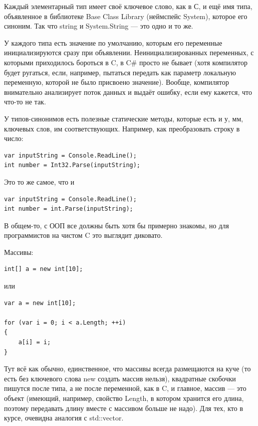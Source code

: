 \documentclass{../../text-style}
\begin{document}
Каждый элементарный тип имеет своё ключевое слово, как в С, и ещё имя типа, объявленное в библиотеке Base Class Library (неймспейс System), которое его синоним. Так что string и System.String --- это одно и то же.

У каждого типа есть значение по умолчанию, которым его переменные инициализируются сразу при объявлении. Неинициализированных переменных, с которыми приходилось бороться в C, в C\# просто не бывает (хотя компилятор будет ругаться, если, например, пытаться передать как параметр локальную переменную, которой не было присвоено значение). Вообще, компилятор внимательно анализирует поток данных и выдаёт ошибку, если ему кажется, что что-то не так.

У типов-синонимов есть полезные статические методы, которые есть и у, мм, ключевых слов, им соответствующих. Например, как преобразовать строку в число:

\begin{verbatim}
var inputString = Console.ReadLine();
int number = Int32.Parse(inputString);
\end{verbatim}

Это то же самое, что и

\begin{verbatim}
var inputString = Console.ReadLine();
int number = int.Parse(inputString);
\end{verbatim}

В общем-то, с ООП все должны быть хотя бы примерно знакомы, но для программистов на чистом C это выглядит диковато.

Массивы:

\begin{verbatim}
int[] a = new int[10];
\end{verbatim}

или

\begin{verbatim}
var a = new int[10];

for (var i = 0; i < a.Length; ++i)
{
    a[i] = i;
}
\end{verbatim}

Тут всё как обычно, единственное, что массивы всегда размещаются на куче (то есть без ключевого слова new создать массив нельзя), квадратные скобочки пишутся после типа, а не после переменной, как в C, и главное, массив --- это объект (имеющий, например, свойство Length, в котором хранится его длина, поэтому передавать длину вместе с массивом больше не надо). Для тех, кто в курсе, очевидна аналогия с std::vector.
\end{document}
